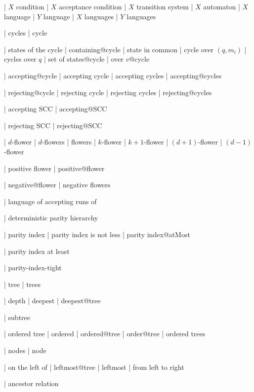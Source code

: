   | $X$ condition
  | $X$ acceptance condition
  | $X$ transition system
  | $X$ automaton
  | $X$ language
  | $Y$ language
  | $X$ languages
  | $Y$ languages


  | cycles
  | cycle
  
  

| states of the cycle
| containing@cycle
| state in common
| cycle over $(q,m_i)$
| cycles over $q$
| set of states@cycle
| over $v$@cycle

| accepting@cycle
| accepting cycle
| accepting cycles
| accepting@cycles

| rejecting@cycle
| rejecting cycle
| rejecting cycles
| rejecting@cycles

  | accepting SCC
  | accepting@SCC

  | rejecting SCC
  | rejecting@SCC


| $d$-flower
| $d$-flowers
| flowers
  | $k$-flower
  | $k+1$-flower
  | $(d+1)$-flower
  | $(d-1)$-flower

| positive flower
| positive@flower

  | negative@flower
  | negative flowers


  | language of accepting runs of


  | deterministic parity hierarchy

  | parity index
  | parity index is not less
  | parity index@atMost  

  | parity index at least


  | parity-index-tight


  | tree
  | trees

  | depth
  | deepest
  | deepest@tree

  | subtree

  | ordered tree
  | ordered
  | ordered@tree
  | order@tree
 | ordered trees
  
  | nodes
  | node

  | on the left of
  | leftmost@tree
  | leftmost
  | from left to right

  | ancestor relation

